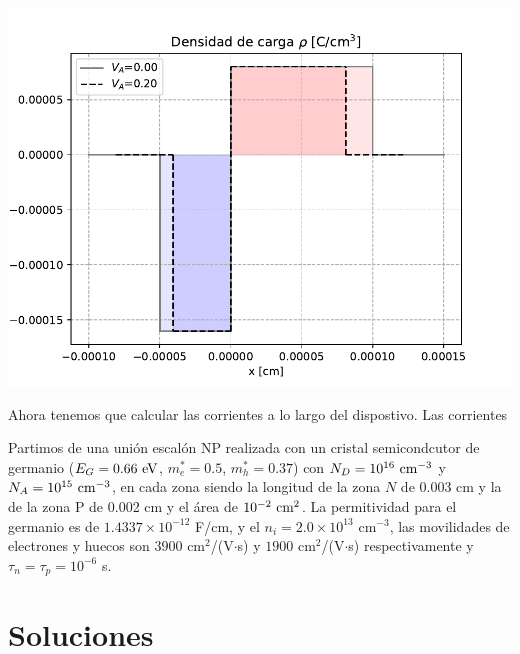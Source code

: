 \begin{texercise}
\begin{enumerate}[label=\alph*)]
\begin{center}
        \end{center}   
        \begin{center}
            \includegraphics[width=0.6\linewidth]{Cuerpo/Ch_03/03_06_rho.pdf}
        \end{center}   
        Ahora tenemos que calcular las corrientes a lo largo del dispostivo. Las corrientes 
    \end{enumerate}    
\end{texercise}

\begin{texercise}
    Partimos de una unión escalón NP realizada con un cristal semicondcutor de germanio ($E_G = 0.66 \ \eV$, $m_e^*=0.5$, $m_h^* = 0.37$) con $N_D=10^{16} \ \text{cm}^{-3}$ y $N_A = 10^{15} \ \text{cm}^{-3}$, en cada zona siendo la longitud de la zona $N$ de 0.003 cm y la de la zona P de 0.002 cm y el área de $10^{-2} \ \text{cm}^2$. La permitividad para el germanio es de $1.4337 \times 10^{-12}$ F/cm, y el $n_i=2.0 \times 10^{13}$ cm$^{-3}$, las movilidades de electrones y huecos son $3900$ cm$^2$/(V$\cdot$s) y $1900$ cm$^2$/(V$\cdot$s) respectivamente y $\tau_n=\tau_p=10^{-6}$ s.
    \tcblower
\end{texercise}



\tcbstoprecording

\newpage

\section{Soluciones}

\tcbinputrecords







